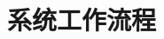\documentclass{ML}
\def\biglen{20cm} %
\def\maxxy{6} %
\def\maxy{3}
\begin{document}

\section{系统工作流程}
\end{document}
